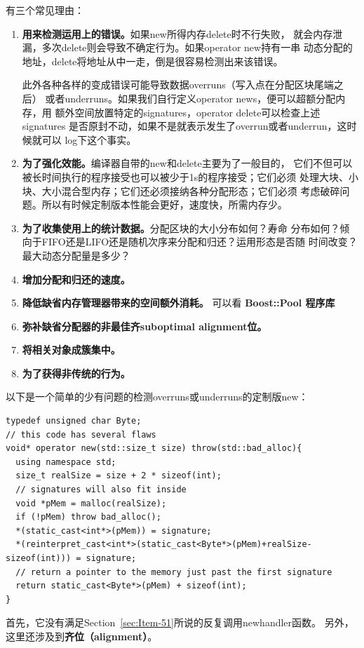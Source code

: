\documentclass[a4paper,twoside]{article}
\theoremstyle{definition}
\theoremstyle{remark}
\numberwithin{equation}{section}
\begin{document}
有三个常见理由：
\begin{enumerate}
\item \textbf{用来检测运用上的错误。}如果new所得内存delete时不行失败，
  就会内存泄漏，多次delete则会导致不确定行为。如果operator new持有一串
  动态分配的地址，delete将地址从中一走，倒是很容易检测出来该错误。

  此外各种各样的变成错误可能导致数据overruns（写入点在分配区块尾端之后）
  或者underruns。如果我们自行定义operator news，便可以超额分配内存，用
  额外空间放置特定的signatures，operator delete可以检查上述signatures
  是否原封不动，如果不是就表示发生了overrun或者underrun，这时候就可以
  log下这个事实。
\item \textbf{为了强化效能。}编译器自带的new和delete主要为了一般目的，
  它们不但可以被长时间执行的程序接受也可以被少于1s的程序接受；它们必须
  处理大块、小块、大小混合型内存；它们还必须接纳各种分配形态；它们必须
  考虑破碎问题。所以有时候定制版本性能会更好，速度快，所需内存少。
\item \textbf{为了收集使用上的统计数据。}分配区块的大小分布如何？寿命
  分布如何？倾向于FIFO还是LIFO还是随机次序来分配和归还？运用形态是否随
  时间改变？最大动态分配量是多少？
\item \textbf{增加分配和归还的速度。}
\item \textbf{降低缺省内存管理器带来的空间额外消耗。} 可以看
  \textbf{Boost::Pool 程序库}
\item \textbf{弥补缺省分配器的非最佳齐suboptimal alignment位。}
\item \textbf{将相关对象成簇集中。}
\item \textbf{为了获得非传统的行为。}
\end{enumerate}

以下是一个简单的少有问题的检测overruns或underruns的定制版new：
\begin{verbatim}
typedef unsigned char Byte;
// this code has several flaws
void* operator new(std::size_t size) throw(std::bad_alloc){
  using namespace std;
  size_t realSize = size + 2 * sizeof(int); 
  // signatures will also fit inside
  void *pMem = malloc(realSize); 
  if (!pMem) throw bad_alloc(); 
  *(static_cast<int*>(pMem)) = signature;
  *(reinterpret_cast<int*>(static_cast<Byte*>(pMem)+realSize-sizeof(int))) = signature;
  // return a pointer to the memory just past the first signature
  return static_cast<Byte*>(pMem) + sizeof(int);
}
\end{verbatim}

首先，它没有满足Section~\ref{sec:Item-51}所说的反复调用newhandler函数。
另外，这里还涉及到\textbf{齐位（alignment）}。
\end{document}
